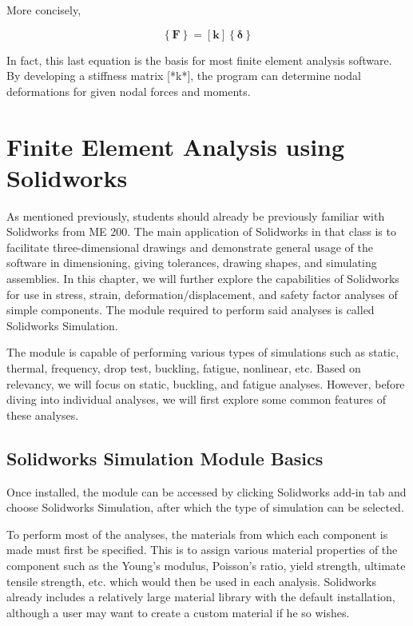 \documentclass[a4paper,openany,12pt]{book}
\begin{document}
{{More concisely,

$$\left\{ \mathbf{F} \right\} = \left[ \mathbf{k} \right]\left\{ \bm\delta \right\}$$

In fact, this last equation is the basis for most finite element
analysis software. By developing a stiffness matrix [*k*], the program
can determine nodal deformations for given nodal forces and moments.

\section{Finite Element Analysis using Solidworks}
\label{finite-element-analysis-using-solidworks}
As mentioned previously, students should already be previously familiar
with Solidworks from ME 200. The main application of Solidworks in that
class is to facilitate three-dimensional drawings and demonstrate
general usage of the software in dimensioning, giving tolerances,
drawing shapes, and simulating assemblies. In this chapter, we will
further explore the capabilities of Solidworks for use in stress,
strain, deformation/displacement, and safety factor analyses of simple
components. The module required to perform said analyses is called
Solidworks Simulation.

The module is capable of performing various types of simulations such as
static, thermal, frequency, drop test, buckling, fatigue, nonlinear,
etc. Based on relevancy, we will focus on static, buckling, and fatigue
analyses. However, before diving into individual analyses, we will first
explore some common features of these analyses.

\subsection{Solidworks Simulation Module Basics}
\label{solidworks-simulation-module-basics}
Once installed, the module can be accessed by clicking Solidworks add-in
tab and choose Solidworks Simulation, after which the type of simulation
can be selected.

To perform most of the analyses, the materials from which each component
is made must first be specified. This is to assign various material
properties of the component such as the Young's modulus, Poisson's
ratio, yield strength, ultimate tensile strength, etc. which would then
be used in each analysis. Solidworks already includes a relatively large
material library with the default installation, although a user may want
to create a custom material if he so wishes.

}}
\end{document}
